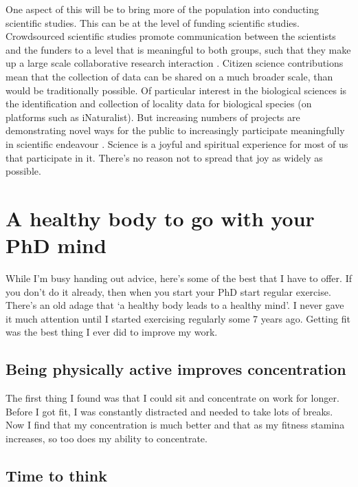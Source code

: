 \documentclass[
]{krantz}
\begin{document}
One aspect of this will be to bring more of the population into conducting scientific studies. This can be at the level of funding scientific studies. Crowdsourced scientific studies promote communication between the scientists and the funders to a level that is meaningful to both groups, such that they make up a large scale collaborative research interaction \citep{uhlmann2019scientific}. Citizen science contributions mean that the collection of data can be shared on a much broader scale, than would be traditionally possible. Of particular interest in the biological sciences is the identification and collection of locality data for biological species (on platforms such as iNaturalist). But increasing numbers of projects are demonstrating novel ways for the public to increasingly participate meaningfully in scientific endeavour \citep{bonney2014next, silvertown2009new}. Science is a joyful and spiritual experience for most of us that participate in it. There's no reason not to spread that joy as widely as possible.

\hypertarget{healthy}{%
\section{A healthy body to go with your PhD mind}\label{healthy}}

While I'm busy handing out advice, here's some of the best that I have to offer. If you don't do it already, then when you start your PhD start regular exercise. There's an old adage that `a healthy body leads to a healthy mind'. I never gave it much attention until I started exercising regularly some 7 years ago. Getting fit was the best thing I ever did to improve my work.

\hypertarget{being-physically-active-improves-concentration}{%
\subsection{Being physically active improves concentration}\label{being-physically-active-improves-concentration}}

The first thing I found was that I could sit and concentrate on work for longer. Before I got fit, I was constantly distracted and needed to take lots of breaks. Now I find that my concentration is much better and that as my fitness stamina increases, so too does my ability to concentrate.

\hypertarget{time-to-think}{%
\subsection{Time to think}\label{time-to-think}}
\end{document}

